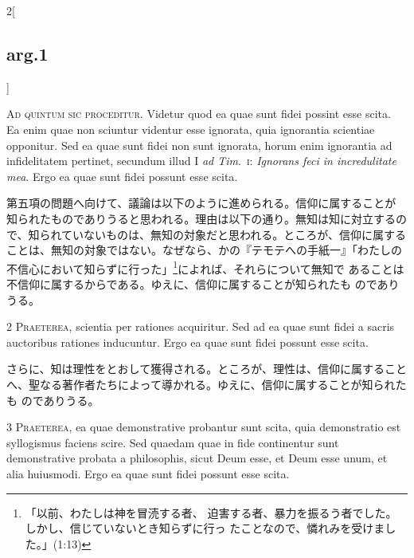\documentclass[paper=a4paper,fontsize=10pt,jafontsize=9pt,titlepage]{jlreq}
\begin{document}
\begin{paracol}{2}[\subsection{arg.1}]

{\huge A}{\scshape d quintum sic proceditur}. Videtur quod ea quae sunt
fidei possint esse scita. Ea enim quae non sciuntur videntur esse
ignorata, quia ignorantia scientiae opponitur. Sed ea quae sunt fidei
non sunt ignorata, horum enim ignorantia ad infidelitatem pertinet,
secundum illud I {\itshape ad Tim}.~{\scshape i}: {\itshape Ignorans
feci in incredulitate mea}. Ergo ea quae sunt fidei possunt esse scita.

\switchcolumn

第五項の問題へ向けて、議論は以下のように進められる。信仰に属することが
知られたものでありうると思われる。理由は以下の通り。無知は知に対立するの
で、知られていないものは、無知の対象だと思われる。ところが、信仰に属する
ことは、無知の対象ではない。なぜなら、かの『テモテへの手紙一』「わたしの
不信心において知らずに行った」\footnote{「以前、わたしは神を冒涜する者、
迫害する者、暴力を振るう者でした。しかし、信じていないとき知らずに行っ
たことなので、憐れみを受けました。」(1:13)}によれば、それらについて無知で
あることは不信仰に属するからである。ゆえに、信仰に属することが知られたも
のでありうる。


{\scshape 2 Praeterea}, scientia per rationes
acquiritur. Sed ad ea quae sunt fidei a sacris auctoribus rationes
inducuntur. Ergo ea quae sunt fidei possunt esse scita.

\switchcolumn

さらに、知は理性をとおして獲得される。ところが、理性は、信仰に属すること
 へ、聖なる著作者たちによって導かれる。ゆえに、信仰に属することが知られたも
 のでありうる。


{\scshape 3 Praeterea}, ea quae demonstrative
probantur sunt scita, quia demonstratio est syllogismus faciens
scire. Sed quaedam quae in fide continentur sunt demonstrative probata a
philosophis, sicut Deum esse, et Deum esse unum, et alia huiusmodi. Ergo
ea quae sunt fidei possunt esse scita.


\end{paracol}
\end{document}
